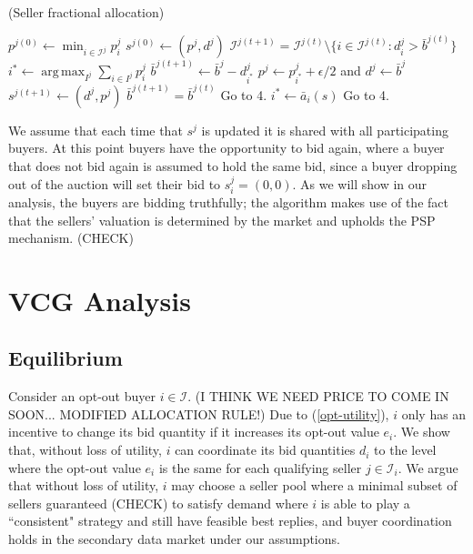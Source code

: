 \documentclass[12pt]{article}
\theoremstyle{definition}
\newcommand{\mcI}{\mathcal{I}}
\DeclareMathOperator*{\argmax}{arg\,max}
\begin{document}
\begin{multicols}{2}
\begin{algorithm}[H]
\caption{(Seller fractional allocation)}
\begin{algorithmic}[1]
\State $p^{j(0)} \gets \min_{i\in\mcI^j} p_i^j$
\State $s^{j(0)} \gets (p^j, d^j)$
\State $\mcI^{j(t+1)} = \mcI^{j(t)}\setminus \lbrace i \in \mcI^{j(t)}: d_i^j >
\bar{b}^{j(t)}\rbrace$
\State $ i^* \gets \displaystyle\argmax_{I^j}\sum_{i\in I^j} p_i^j$ 
\State $\bar{b}^{j(t+1)} \gets \bar{b}^j - d_{i^*}^{j}$
\State $p^j \gets p_{i^*}^j+\epsilon/2$ and $d^j \gets \bar{b}^j$
\State $s^{j(t+1)} \gets (d^j, p^j)$
\State $\bar{b}^{j(t+1)} = \bar{b}^{j(t)}$
\State Go to 4.
\Else
\State $i^* \gets \bar a_i(s)$
\State Go to 4.
\EndIf
\EndWhile
\end{algorithmic}
\end{algorithm}
We assume that each time that $s^j$ is updated it is shared with all
participating buyers. At this point buyers have the opportunity to bid again,
where a buyer that does not bid again is assumed to hold the same bid, since a
buyer dropping out of the auction will set their bid to $s_i^j=(0,0)$. As we will show in our analysis, the buyers are bidding truthfully; the
algorithm makes use of the fact that the sellers' valuation is determined by the
market and upholds the PSP mechanism. (CHECK)

\section{VCG Analysis}\label{analysis}
\subsection{Equilibrium}

Consider an opt-out buyer $i\in\mcI$. 
(I THINK WE NEED PRICE TO COME IN SOON... MODIFIED ALLOCATION RULE!)
Due to (\ref{opt-utility}), $i$ only has an incentive to change its bid
quantity if it increases its opt-out value $e_i$. 
We show that, without loss of utility, $i$ can coordinate its
bid quantities $d_i$ to the level where the opt-out value $e_i$ 
 is the same for each qualifying seller $j \in\mcI_i$. We argue
that without loss of utility, $i$ may choose a seller pool where a minimal subset
of sellers guaranteed (CHECK) to satisfy demand where $i$ is able to play a
``consistent" 
strategy and still have feasible best replies, and buyer
coordination holds in the secondary data market under our assumptions.


\end{multicols}
\end{document}
